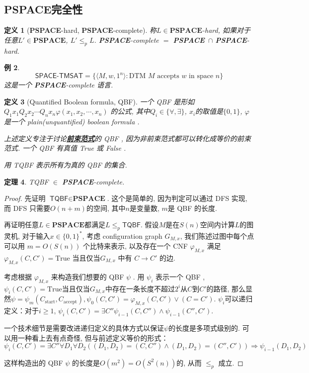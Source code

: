 \documentclass[8pt]{article}
\theoremstyle{compact}
\newtheorem{theorem}{定理}[section]
\newtheorem{definition}[theorem]{定义}
\newtheorem{example}[theorem]{例}
\def\obj#1{\textbf{\uline{#1}}}
\def\le{\leqslant}
\def\ge{\geqslant}
\def\PSPACE{\textbf{PSPACE}}
\begin{document}
\subsection{\PSPACE 完全性}
\begin{definition}[\PSPACE-hard, \PSPACE-complete]
	称$L \in \PSPACE$-hard, 如果对于任意$L' \in \PSPACE$, $L' \le_p L$. \PSPACE-complete $=$ \PSPACE\ $\cap$ \PSPACE-hard.  
\end{definition}
\begin{example}
	$$\textsf{SPACE-TMSAT} = \{ \langle M, w, 1^n \rangle : \textrm{DTM } M \textrm{ accepts } w \textrm{ in space } n \}$$
	这是一个 \PSPACE-complete 语言. 
\end{example}
\begin{definition}[Quantified Boolean formula, QBF]
	一个 QBF 是形如 $Q_1x_1Q_2x_2 \cdots Q_nx_n \varphi(x_1, x_2, \cdots, x_n)$ 的公式, 其中$Q_i \in \{\forall, \exists\}$, $x_i$的取值是$\{0, 1\}$, $\varphi$是一个 plain(unquantified) boolean formula . 

	上述定义专注于讨论\obj{前束范式}的 QBF , 因为非前束范式都可以转化成等价的前束范式. 一个 QBF 有真值 True 或 False . 

	用 \textsf{TQBF} 表示所有为真的 QBF 的集合. 
\end{definition}
\begin{theorem}
	\textsf{TQBF} $\in$ \PSPACE-complete.
	\label{TQBF}
\end{theorem}
\begin{proof}
	先证明 $\textsf{TQBF} \in \PSPACE$. 这个是简单的, 因为判定可以通过 DFS 实现, 而 DFS 只需要$O(n + m)$的空间, 其中$n$是变量数, $m$是 QBF 的长度. 

	再证明任意$L \in \PSPACE$都满足$L \le_p \textsf{TQBF}$. 假设$M$是在$S(n)$空间内计算$L$的图灵机, 对于输入$x \in \{0, 1\}^*$, 考虑 configuration graph $G_{M, x}$, 我们陈述过图中每个点可以用 $m = O(S(n))$ 个比特来表示, 以及存在一个 CNF $\varphi_{M, x}$ 满足$\varphi_{M, x}(C, C') = \textrm{True}$ 当且仅当$G_{M, x}$ 中有 $C \to C'$ 的边. 

	考虑根据 $\varphi_{M, x}$ 来构造我们想要的 QBF $\psi$ . 用 $\psi_i$ 表示一个 QBF , $\psi_i(C, C') = \textrm{True}$当且仅当$G_{M, x}$中存在一条长度不超过$2^i$从$C$到$C'$的路径, 那么显然$\psi = \psi_m(C_{\text{start}}, C_{\text{accept}}), \psi_0(C, C') = \varphi_{M, x}(C, C') \vee (C = C')$. $\psi_i$可以递归定义：对于$i \ge 1$, $\psi_i(C, C') = \exists C'' \psi_{i-1}(C, C'') \wedge \psi_{i-1}(C'', C')$. 

	一个技术细节是需要改进递归定义的具体方式以保证$\psi$的长度是多项式级别的. 可以用一种看上去有点奇怪, 但与前述定义等价的形式：
	$$\psi_i(C, C') = \exists C''\forall D_1 \forall D_2 ((D_1, D_2) = (C, C'') \wedge (D_1, D_2) = (C'', C')) \Rightarrow \psi_{i-1}(D_1, D_2)$$

	这样构造出的 QBF $\psi$ 的长度是$O(m^2) = O(S^2(n))$的, 从而 $\le_p$ 成立.
\end{proof}
\end{document}
